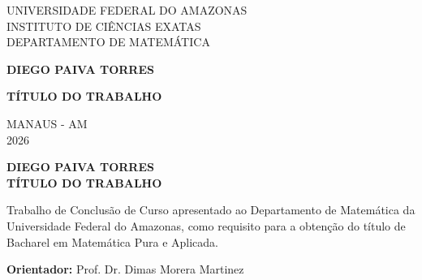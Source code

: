 \documentclass[a4paper,12pt]{report}
\begin{document}
	
	
	
	\thispagestyle{empty}
	
	\begin{center}
		
		UNIVERSIDADE FEDERAL DO AMAZONAS\\
		INSTITUTO DE CIÊNCIAS EXATAS\\
		DEPARTAMENTO DE MATEMÁTICA
		
		\vspace{5 cm}
		\bf{DIEGO PAIVA TORRES}\\
		
		\vspace{5 cm}
		\begin{center}
			\Large {\bf {TÍTULO DO TRABALHO}}
		\end{center}
		
		
		\vspace{7cm}
		
		MANAUS - AM\\
		2026
	\end{center}
	
	\thispagestyle{empty}
	
	\newpage
	
	
	\thispagestyle{empty}
	
	\begin{center}
		\bf{DIEGO PAIVA TORRES} \vspace{7cm}\\
		
		\Large {\bf {TÍTULO DO TRABALHO}} \vspace{3cm}\\
	\end{center}
	
	\begin{flushright}
		\begin{minipage}[10cm]{8.5cm}
			{\footnotesize
				Trabalho de Conclusão de Curso apresentado ao Departamento de Matemática da Universidade Federal do Amazonas, como requisito para a obtenção do  título de Bacharel em Matemática Pura e Aplicada.\\ 
			}
		\end{minipage}
	\end{flushright}
	\vspace{1cm}
	
	\begin{center}
		{\bf Orientador:} Prof. Dr. Dimas Morera Martinez
	\end{center}
	
\end{document}
